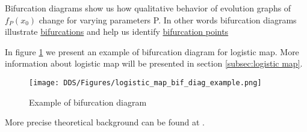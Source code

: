 \begin{remark}
    Bifurcation diagrams show us how qualitative behavior of evolution graphs of $f_P(x_0)$ change for varying parameters P.
    In other words bifurcation diagrams illustrate \hyperref[def:bifurcation]{bifurcations} and help us identify \hyperref[def:bifurcation_point]{bifurcation points}
\end{remark}

\begin{example}
    In figure \ref{fig:bif_diag_example} we present an example of bifurcation diagram for logistic map. More information about logistic map will be presented in section \ref{subsec:logistic map}.
    \begin{figure}[!h]
        \centering
        \texttt{[image: DDS/Figures/logistic\_map\_bif\_diag\_example.png]}
        \caption{Example of bifurcation diagram}
        \label{fig:bif_diag_example}
    \end{figure}
\end{example}

More precise theoretical background can be found at \cite{Devaney20211026,Elaskar2017,Lynch2014}.

\endinput